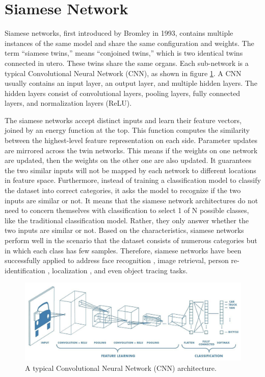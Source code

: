 \section{Siamese Network}

Siamese networks, first introduced by Bromley \cite{bromley1993signature} in 1993, contains multiple instances of the same model and share the same configuration and weights. The term “siamese twins,” means “conjoined twins,” which is two identical twins connected in utero. These twins share the same organs. Each sub-network is a typical Convolutional Neural Network (CNN), as shown in figure \ref{fig:cnn}. A CNN usually contains an input layer, an output layer, and multiple hidden layers. The hidden layers consist of convolutional layers, pooling layers, fully connected layers, and normalization layers (ReLU). 

The siamese networks accept distinct inputs and learn their feature vectors, joined by an energy function at the top. This function computes the similarity between the highest-level feature representation on each side. Parameter updates are mirrored across the twin networks. This means if the weights on one network are updated, then the weights on the other one are also updated. It guarantees the two similar inputs will not be mapped by each network to different locations in feature space. Furthermore, instead of training a classification model to classify the dataset into correct categories, it asks the model to recognize if the two inputs are similar or not. It means that the siamese network architectures do not need to concern themselves with classification to select 1 of N possible classes, like the traditional classification model. Rather, they only answer whether the two inputs are similar or not. Based on the characteristics, siamese networks perform well in the scenario that the dataset consists of numerous categories but in which each class has few samples. Therefore, siamese networks have been successfully applied to address face recognition \cite{}, image retrieval, person re-identification \cite{}, localization \cite{}, and even object tracing \cite{} tasks. 


\begin{figure}[h]
  \centering
  \includegraphics[width=\linewidth]{figs/cnn.png}
  \caption{A typical Convolutional Neural Network (CNN) architecture.}
  \label{fig:cnn}
\end{figure}

